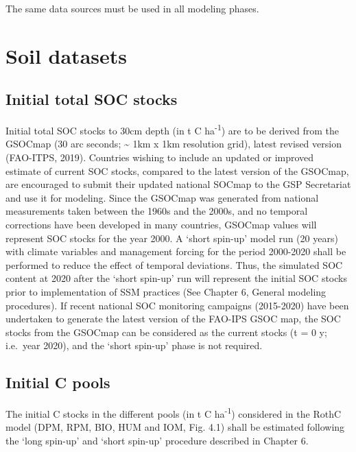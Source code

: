 \documentclass[
  10pt,
  b5paper,
]{book}
\begin{document}
The same data sources must be used in all modeling phases.

\hypertarget{soil-datasets}{%
\section{Soil datasets}\label{soil-datasets}}

\hypertarget{initial-total-soc-stocks}{%
\subsection{Initial total SOC stocks}\label{initial-total-soc-stocks}}

Initial total SOC stocks to 30cm depth (in t C ha\textsuperscript{-1}) are to be derived from the GSOCmap (30 arc seconds; \textasciitilde{} 1km x 1km resolution grid), latest revised version (FAO-ITPS, 2019). Countries wishing to include an updated or improved estimate of current SOC stocks, compared to the latest version of the GSOCmap, are encouraged to submit their updated national SOCmap to the GSP Secretariat and use it for modeling.
Since the GSOCmap was generated from national measurements taken between the 1960s and the 2000s, and no temporal corrections have been developed in many countries, GSOCmap values will represent SOC stocks for the year 2000. A `short spin-up' model run (20 years) with climate variables and management forcing for the period 2000-2020 shall be performed to reduce the effect of temporal deviations. Thus, the simulated SOC content at 2020 after the `short spin-up' run will represent the initial SOC stocks prior to implementation of SSM practices (See Chapter 6, General modeling procedures). If recent national SOC monitoring campaigns (2015-2020) have been undertaken to generate the latest version of the FAO-IPS GSOC map, the SOC stocks from the GSOCmap can be considered as the current stocks (t = 0 y; i.e.~year 2020), and the `short spin-up' phase is not required.

\hypertarget{initial-c-pools}{%
\subsection{Initial C pools}\label{initial-c-pools}}

The initial C stocks in the different pools (in t C ha\textsuperscript{-1}) considered in the RothC model (DPM, RPM, BIO, HUM and IOM, Fig. 4.1) shall be estimated following the `long spin-up' and `short spin-up' procedure described in Chapter 6.
\end{document}
